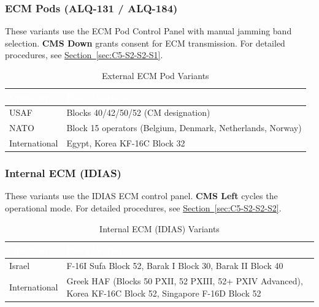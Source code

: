 \documentclass[11pt, a4paper, twoside]{report}
\newcommand{\secref}[1]{\hyperref[#1]{Section~\ref*{#1}}}
\begin{document}
\subsubsection{ECM Pods (ALQ-131 / ALQ-184)}
\label{sec:C5-S3-S1-S1}

These variants use the ECM Pod Control Panel with manual jamming band selection. \textbf{CMS Down} grants consent for ECM transmission. For detailed procedures, see \secref{sec:C5-S2-S2-S1}.

\begin{table}[H]
\centering
\caption{External ECM Pod Variants}
\label{tab:C5-S3-external-ecm-pods}
\small
\renewcommand{\arraystretch}{1.25}
\begin{tabular}{|>{\raggedright\arraybackslash}p{3.0cm}|>{\raggedright\arraybackslash}p{5.8cm}|}
\hline
\rowcolor{headerblue}
\textcolor{white}{\textbf{Operator}} & \textcolor{white}{\textbf{Block/Variant}} \\
\hline
USAF & Blocks 40/42/50/52 (CM designation) \\
\hline
NATO & Block 15 operators (Belgium, Denmark, Netherlands, Norway) \\
\hline
International & Egypt, Korea KF-16C Block 32 \\
\hline
\end{tabular}
\end{table}

\subsubsection{Internal ECM (IDIAS)}
\label{sec:C5-S3-S1-S2}

These variants use the IDIAS ECM control panel. \textbf{CMS Left} cycles the operational mode. For detailed procedures, see \secref{sec:C5-S2-S2-S2}.

\begin{table}[H]
\centering
\caption{Internal ECM (IDIAS) Variants}
\label{tab:C5-S3-internal-ecm}
\small
\renewcommand{\arraystretch}{1.25}
\begin{tabular}{|>{\raggedright\arraybackslash}p{3.0cm}|>{\raggedright\arraybackslash}p{5.8cm}|}
\hline
\rowcolor{headerblue}
\textcolor{white}{\textbf{Operator}} & \textcolor{white}{\textbf{Block/Variant}} \\
\hline
Israel & F-16I Sufa Block 52, Barak I Block 30, Barak II Block 40 \\
\hline
International & Greek HAF (Blocks 50 PXII, 52 PXIII, 52+ PXIV Advanced),
Korea KF-16C Block 52, Singapore F-16D Block 52 \\
\hline
\end{tabular}
\end{table}

\end{document}
